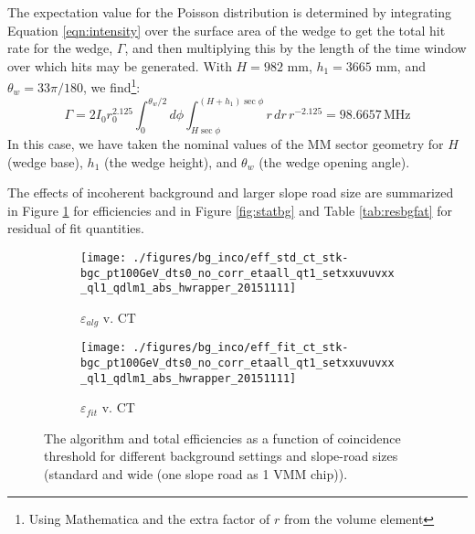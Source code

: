 The expectation value for the Poisson distribution is determined by integrating Equation \ref{eqn:intensity} over the surface area of the wedge to get the total hit rate for the wedge, $\Gamma$, and then multiplying this by the length of the time window over which hits may be generated.  With $H=982$ mm, $h_1=3665$ mm, and $\theta_w=33\pi/180$, we find\footnote{Using Mathematica and the extra factor of $r$ from the volume element}:
\begin{equation}
\Gamma=2I_0r_0^{2.125}\int_0^{\theta_w/2}d\phi\int_{H\sec\phi}^{\left(H+h_1\right)\sec\phi}r\,dr\,r^{-2.125}=98.6657\,\text{MHz}
\end{equation}
In this case, we have taken the nominal values of the MM sector geometry for $H$ (wedge base), $h_1$ (the wedge height), and $\theta_w$ (the wedge opening angle).


  The effects of incoherent background and larger slope road size are summarized in Figure \ref{fig:effbg} for efficiencies and in Figure \ref{fig:statbg} and Table \ref{tab:resbgfat} for residual of fit quantities.

\begin{figure}[!htbp]\captionsetup{justification=centering}
  \begin{center}
    \begin{subfigure}{0.450\textwidth}\caption{$\varepsilon_{alg}$ v. CT}\texttt{[image: ./figures/bg\_inco/eff\_std\_ct\_stk-bgc\_pt100GeV\_dts0\_no\_corr\_etaall\_qt1\_setxxuvuvxx\_ql1\_qdlm1\_abs\_hwrapper\_20151111]}\end{subfigure}
    \begin{subfigure}{0.450\textwidth}\caption{$\varepsilon_{fit}$ v. CT}\texttt{[image: ./figures/bg\_inco/eff\_fit\_ct\_stk-bgc\_pt100GeV\_dts0\_no\_corr\_etaall\_qt1\_setxxuvuvxx\_ql1\_qdlm1\_abs\_hwrapper\_20151111]}\end{subfigure}
    \caption{\label{fig:effbg} The algorithm and total efficiencies as a function of coincidence threshold for different background settings and slope-road sizes (standard and wide (one slope road as 1 VMM chip)).}
  \end{center}
\end{figure}

